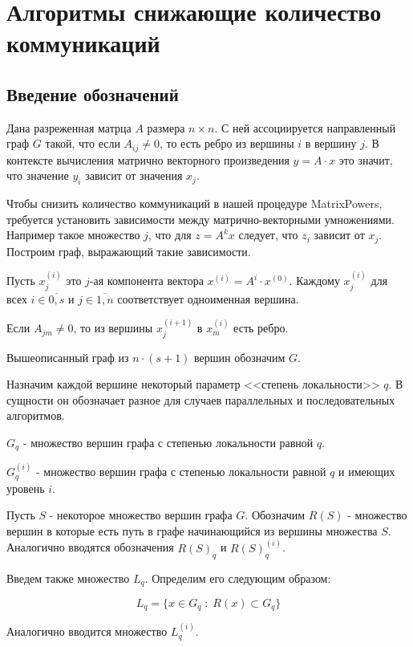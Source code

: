 \documentclass[a4paper,12pt]{report}
\begin{document}
    \chapter{ Алгоритмы снижающие количество коммуникаций }

    \section{ Введение обозначений }

    Дана разреженная матрца $A$ размера $n \times n$. С ней ассоциируется направленный граф $G$ такой, что если $A_{ij} \ne 0$, то есть ребро из вершины $i$ в вершину $j$. В контексте вычисления матрично векторного произведения $y = A \cdot x$ это значит, что значение $y_i$ зависит от значения $x_j$.

    Чтобы снизить количество коммуникаций в нашей процедуре MatrixPowers, требуется установить зависимости между матрично-векторными умножениями. Например такое множество $j$, что для $z = A^k x$ следует, что $z_i$ зависит от $x_j$. Построим граф, выражающий такие зависимости.

    Пусть $x_j^{(i)}$ это $j$-ая компонента вектора $x^{(i)} = A^i \cdot x^{(0)}$. Каждому $x_j^{(i)}$ для всех $i \in \overline{0, s}$ и $j \in \overline{1,n}$ соответствует одноименная вершина.

    Если $A_{jm} \ne 0$, то из вершины $x_j^{(i+1)}$ в $x_m^{(i)}$ есть ребро.

    Вышеописанный граф из $n \cdot (s + 1)$ вершин обозначим $G$.

    Назначим каждой вершине некоторый параметр <<степень локальности>> $q$. В сущности он обозначает разное для случаев параллельных и последовательных алгоритмов.
    
    $G_q$ - множество вершин графа с степенью локальности равной $q$. 

    $G_q^{(i)}$ - множество вершин графа с степенью локальности равной $q$ и имеющих уровень $i$.

    Пусть $S$ - некоторое множество вершин графа $G$. Обозначим $R(S)$ - множество вершин в которые есть путь в графе начинающийся из вершины множества $S$. Аналогично вводятся обозначения $R(S)_q$ и $R(S)_q^{(i)}$.

    Введем также множество $L_q$. Определим его следующим образом:

    $$ L_q = \{ x \in G_q \; : \; R(x) \subset G_q \} $$

    Аналогично вводится множество $L_q^{(i)}$.
\end{document}

